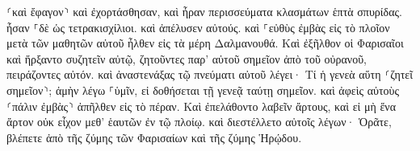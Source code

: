 \documentclass{openreader}
\begin{document}
⸂καὶ ἔφαγον⸃ καὶ ἐχορτάσθησαν, καὶ ἦραν περισσεύματα κλασμάτων ἑπτὰ σπυρίδας. 
ἦσαν ⸀δὲ ὡς τετρακισχίλιοι. καὶ ἀπέλυσεν αὐτούς. 
καὶ ⸀εὐθὺς ἐμβὰς εἰς τὸ πλοῖον μετὰ τῶν μαθητῶν αὐτοῦ ἦλθεν εἰς τὰ μέρη Δαλμανουθά. 
Καὶ ἐξῆλθον οἱ Φαρισαῖοι καὶ ἤρξαντο συζητεῖν αὐτῷ, ζητοῦντες παρ’ αὐτοῦ σημεῖον ἀπὸ τοῦ οὐρανοῦ, πειράζοντες αὐτόν. 
καὶ ἀναστενάξας τῷ πνεύματι αὐτοῦ λέγει· Τί ἡ γενεὰ αὕτη ⸂ζητεῖ σημεῖον⸃; ἀμὴν λέγω ⸀ὑμῖν, εἰ δοθήσεται τῇ γενεᾷ ταύτῃ σημεῖον. 
καὶ ἀφεὶς αὐτοὺς ⸂πάλιν ἐμβὰς⸃ ἀπῆλθεν εἰς τὸ πέραν. 
Καὶ ἐπελάθοντο λαβεῖν ἄρτους, καὶ εἰ μὴ ἕνα ἄρτον οὐκ εἶχον μεθ’ ἑαυτῶν ἐν τῷ πλοίῳ. 
καὶ διεστέλλετο αὐτοῖς λέγων· Ὁρᾶτε, βλέπετε ἀπὸ τῆς ζύμης τῶν Φαρισαίων καὶ τῆς ζύμης Ἡρῴδου. 
\end{document}
